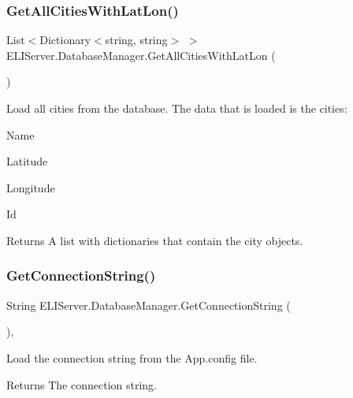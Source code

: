\subsubsection{\texorpdfstring{Get\+All\+Cities\+With\+Lat\+Lon()}{GetAllCitiesWithLatLon()}}
{\footnotesize\ttfamily List$<$Dictionary$<$string, string$>$ $>$ E\+L\+I\+Server.\+Database\+Manager.\+Get\+All\+Cities\+With\+Lat\+Lon (\begin{DoxyParamCaption}{ }\end{DoxyParamCaption})\hspace{0.3cm}{\ttfamily [inline]}}



Load all cities from the database. The data that is loaded is the cities\+: 


\begin{DoxyItemize}
\item Name
\item Latitude
\item Longitude
\item Id 
\end{DoxyItemize}

\begin{DoxyReturn}{Returns}
A list with dictionaries that contain the city objects.
\end{DoxyReturn}
\mbox{\label{class_e_l_i_server_1_1_database_manager_a2a2f09721d3e5ea9db778d74e517e8da}} 
\subsubsection{\texorpdfstring{Get\+Connection\+String()}{GetConnectionString()}}
{\footnotesize\ttfamily String E\+L\+I\+Server.\+Database\+Manager.\+Get\+Connection\+String (\begin{DoxyParamCaption}{ }\end{DoxyParamCaption})\hspace{0.3cm}{\ttfamily [inline]}, {\ttfamily [private]}}



Load the connection string from the App.\+config file. 

\begin{DoxyReturn}{Returns}
The connection string.
\end{DoxyReturn}
\mbox{\label{class_e_l_i_server_1_1_database_manager_a9732d7fca81399afcb1ad6f5f01a42f3}} 
